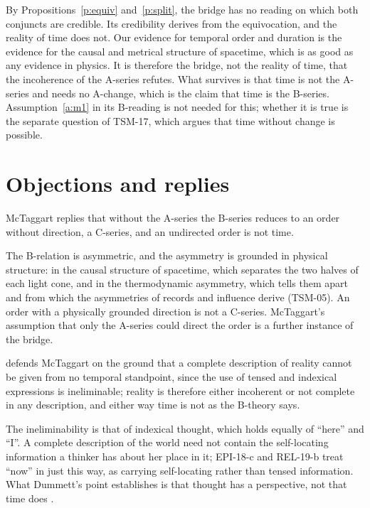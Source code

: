 \documentclass{situationist-preprint}
\begin{document}
By Propositions~\ref{p:equiv} and~\ref{p:split}, the bridge has no reading on which both conjuncts are credible. Its credibility derives from the equivocation, and the reality of time does not. Our evidence for temporal order and duration is the evidence for the causal and metrical structure of spacetime, which is as good as any evidence in physics. It is therefore the bridge, not the reality of time, that the incoherence of the A-series refutes. What survives is that time is not the A-series and needs no A-change, which is the claim that time is the B-series. Assumption~\ref{a:m1} in its B-reading is not needed for this; whether it is true is the separate question of TSM-17, which argues that time without change is possible.

\section{Objections and replies}

\begin{objection}
McTaggart replies that without the A-series the B-series reduces to an order without direction, a C-series, and an undirected order is not time.
\end{objection}

\begin{reply}
The B-relation is asymmetric, and the asymmetry is grounded in physical structure: in the causal structure of spacetime, which separates the two halves of each light cone, and in the thermodynamic asymmetry, which tells them apart and from which the asymmetries of records and influence derive (TSM-05). An order with a physically grounded direction is not a C-series. McTaggart's assumption that only the A-series could direct the order is a further instance of the bridge.
\end{reply}

\begin{objection}[Dummett]
\citet{Dummett1960} defends McTaggart on the ground that a complete description of reality cannot be given from no temporal standpoint, since the use of tensed and indexical expressions is ineliminable; reality is therefore either incoherent or not complete in any description, and either way time is not as the B-theory says.
\end{objection}

\begin{reply}
The ineliminability is that of indexical thought, which holds equally of \enquote{here} and \enquote{I}. A complete description of the world need not contain the self-locating information a thinker has about her place in it; EPI-18-c and REL-19-b treat \enquote{now} in just this way, as carrying self-locating rather than tensed information. What Dummett's point establishes is that thought has a perspective, not that time does \citep{Mellor1998}.
\end{reply}
\end{document}
